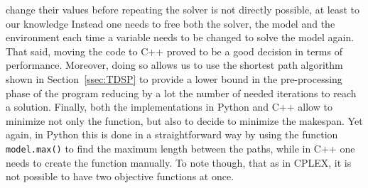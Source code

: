 change their values before repeating the solver is not directly possible, at
least to our knowledge Instead one needs to free both the solver, the model and
the environment each time a variable needs to be changed to solve the model
again. That said, moving the code to C++ proved to be a good decision in terms
of performance. \newline
Moreover, doing so allows us to use the shortest path algorithm shown in
Section~\ref{ssec:TDSP} to provide a lower bound in the pre-processing phase of
the program reducing by a lot the number of needed iterations to reach a
solution. \newline
Finally, both the implementations in Python and C++ allow to minimize not only
the  function, but also to decide to minimize the makespan. Yet 
again, in Python this is done in a straightforward way by using the function
\texttt{model.max()} to find the maximum length between the paths, while in C++
one needs to create the function manually. To note though, that as in CPLEX, it
is not possible to have two objective functions at once.
